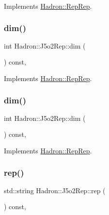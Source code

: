 Implements \mbox{\hyperlink{structHadron_1_1RepRep_a92c8802e5ed7afd7da43ccfd5b7cd92b}{Hadron\+::\+Rep\+Rep}}.

\mbox{\label{structHadron_1_1J5o2Rep_a0a185f6fcbb5ce65c0af1615cf1f4e76}} 
\subsubsection{\texorpdfstring{dim()}{dim()}\hspace{0.1cm}{\footnotesize\ttfamily [4/5]}}
{\footnotesize\ttfamily int Hadron\+::\+J5o2\+Rep\+::dim (\begin{DoxyParamCaption}{ }\end{DoxyParamCaption}) const\hspace{0.3cm}{\ttfamily [inline]}, {\ttfamily [virtual]}}



Implements \mbox{\hyperlink{structHadron_1_1RepRep_a92c8802e5ed7afd7da43ccfd5b7cd92b}{Hadron\+::\+Rep\+Rep}}.

\mbox{\label{structHadron_1_1J5o2Rep_a0a185f6fcbb5ce65c0af1615cf1f4e76}} 
\subsubsection{\texorpdfstring{dim()}{dim()}\hspace{0.1cm}{\footnotesize\ttfamily [5/5]}}
{\footnotesize\ttfamily int Hadron\+::\+J5o2\+Rep\+::dim (\begin{DoxyParamCaption}{ }\end{DoxyParamCaption}) const\hspace{0.3cm}{\ttfamily [inline]}, {\ttfamily [virtual]}}



Implements \mbox{\hyperlink{structHadron_1_1RepRep_a92c8802e5ed7afd7da43ccfd5b7cd92b}{Hadron\+::\+Rep\+Rep}}.

\mbox{\label{structHadron_1_1J5o2Rep_a43d3fc5ff7f61a64d8dac3b700b2c140}} 
\subsubsection{\texorpdfstring{rep()}{rep()}\hspace{0.1cm}{\footnotesize\ttfamily [1/5]}}
{\footnotesize\ttfamily std\+::string Hadron\+::\+J5o2\+Rep\+::rep (\begin{DoxyParamCaption}{ }\end{DoxyParamCaption}) const\hspace{0.3cm}{\ttfamily [inline]}, {\ttfamily [virtual]}}



